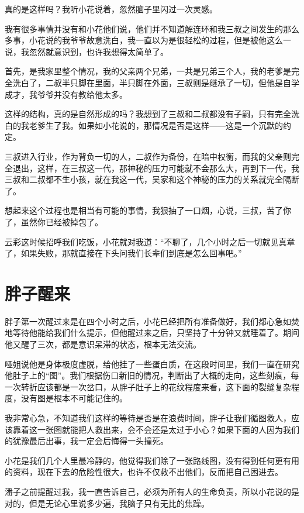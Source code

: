真的是这样吗？我听小花说着，忽然脑子里闪过一次灵感。

我有很多事情并没有和小花他们说，他们并不知道解连环和我三叔之间发生的那么多事，小花说的我爷爷故意洗白，我一直以为是很轻松的过程，但是被他这么一说，我忽然就意识到，也许我想得太简单了。

首先，是我家里整个情况，我的父亲两个兄弟，一共是兄弟三个人，我的老爹是完全洗白了，二叔半只脚在里面，半只脚在外面，三叔则是继承了一切，但他是自学成才，我爷爷并没有教给他太多。

这样的结构，真的是自然形成的吗？我想到了三叔和二叔都没有子嗣，只有完全洗白的我老爹生了我。如果如小花说的，那情况是否是这样——这是一个沉默的约定。

三叔进入行业，作为背负一切的人，二叔作为备份，在暗中权衡，而我的父亲则完全退出，这样，在三叔这一代，那神秘的压力可能就不会那么大，再到下一代，我三叔和二叔都不生小孩，就在我这一代，吴家和这个神秘的压力的关系就完全隔断了。

想起来这个过程也是相当有可能的事情，我狠抽了一口烟，心说，三叔，苦了你了，虽然你已经被掉包了。

云彩这时候招呼我们吃饭，小花就对我道：“不聊了，几个小时之后一切就见真章了，如果失败，那就直接在下头问我们长辈们到底是怎么回事吧。”

\chapter{胖子醒来}

胖子第一次醒过来是在四个小时之后，小花已经把所有准备做好，我们都心急如焚地等待他能给我们什么提示，但他醒过来之后，只坚持了十分钟又就睡着了。期间他又醒了三次，都是意识呆滞的状态，根本无法交流。

哑姐说他是身体极度虚脱，给他挂了一些蛋白质，在这段时间里，我们一直在研究他肚子上的“图”。我们根据伤口新旧的情况，判断出了大概的走向，这些刻痕，每一次转折应该都是一次岔口，从胖子肚子上的花纹程度来看，这下面的裂缝复杂程度，没有图是根本不可能记住的。

我非常心急，不知道我们这样的等待是否是在浪费时间，胖子让我们循图救人，应该靠着这一张图就能把人救出来，会不会还是太过于小心？如果下面的人因为我们的犹豫最后出事，我一定会后悔得一头撞死。

小花是我们几个人里最冷静的，他觉得我们除了一张路线图，没有得到任何更有用的资料，现在下去的危险性很大，也许不仅救不出他们，反而把自己困进去。

潘子之前提醒过我，我一直告诉自己，必须为所有人的生命负责，所以小花说的是对的，但是无论心里说多少遍，我脑子只有无比的焦躁。

